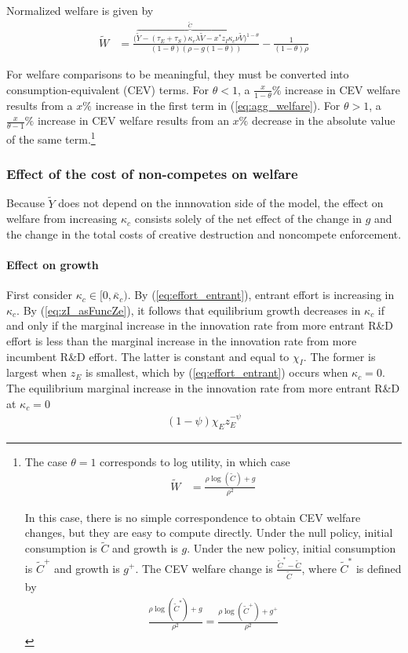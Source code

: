 \documentclass[12pt,english]{article}
\theoremstyle{remark}
\begin{document}
Normalized welfare is given by 
\begin{align}
\tilde{W} &= \frac{\big(\overbrace{\tilde{Y} - (\tau_E + \tau_S) \kappa_{e} \lambda \tilde{V} - x^* z_I \kappa_c \nu \tilde{V}}^{\tilde{C}}\big)^{1-\theta}}{(1-\theta)(\rho - g(1-\theta))} - \frac{1}{(1-\theta)\rho}  \label{eq:agg_welfare}
\end{align}


For welfare comparisons to be meaningful, they must be converted into consumption-equivalent (CEV) terms. For $\theta < 1$, a $\frac{x}{1-\theta}\%$ increase in CEV welfare results from a $x\%$ increase in the first term in (\ref{eq:agg_welfare}). For $\theta > 1$, a $\frac{x}{\theta-1}\%$ increase in CEV welfare results from an $x\%$ decrease in the absolute value of the same term.\footnote{The case $\theta = 1$ corresponds to log utility, in which case
	\begin{align}
	\tilde{W} &= \frac{\rho \log(\tilde{C}) + g}{\rho^2} \label{eq:agg_welfare_log}
	\end{align}
	
	In this case, there is no simple correspondence to obtain CEV welfare changes, but they are easy to compute directly. Under the null policy, initial consumption is $\tilde{C}$ and growth is $g$. Under the new policy, initial consumption is $\tilde{C}^+$ and growth is $g^+$. The CEV welfare change is $\frac{\tilde{C}^* - \tilde{C}}{\tilde{C}}$, where $\tilde{C}^*$ is defined by 
	\begin{align}
	\frac{\rho\log(\tilde{C}^*) + g}{\rho^2} = \frac{\rho \log(\tilde{C}^+) + g^+}{\rho^2} \label{eq:agg_welfare_log_CEV}
	\end{align}}

\subsubsection{Effect of the cost of non-competes on welfare}

Because $\tilde{Y}$ does not depend on the innnovation side of the model, the effect on welfare from increasing $\kappa_c$ consists solely of the net effect of the change in $g$ and the change in the total costs of creative destruction and noncompete enforcement.

\paragraph{Effect on growth}

First consider $\kappa_c \in [0, \bar{\kappa}_c)$. By (\ref{eq:effort_entrant}), entrant effort is increasing in $\kappa_c$. By (\ref{eq:zI_asFuncZe}), it follows that equilibrium growth decreases in $\kappa_c$ if and only if the marginal increase in the innovation rate from more entrant R\&D effort is less than the marginal increase in the innovation rate from more incumbent R\&D effort. The latter is constant and equal to $\chi_I$. The former is largest when $z_E$ is smallest, which by (\ref{eq:effort_entrant}) occurs when $\kappa_c = 0$. The equilibrium marginal increase in the innovation rate from more entrant R\&D at $\kappa_c = 0$
\begin{align}
	(1-\psi) \chi_E z_E^{-\psi} 
\end{align}
\end{document}
